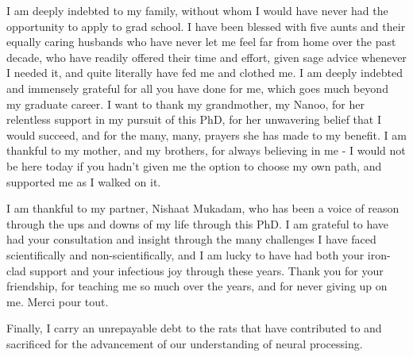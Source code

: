 \documentclass{brandeis-dissertation3.12}
\begin{document}
\begin{dissertation-acknowledgements}
I am deeply indebted to my family, without whom I would have never had the opportunity to apply to grad school. I have been blessed with five aunts and their equally caring husbands who have never let me feel far from home over the past decade, who have readily offered their time and effort, given sage advice whenever I needed it, and quite literally have fed me and clothed me. I am deeply indebted and immensely grateful for all you have done for me, which goes much beyond my graduate career. I want to thank my grandmother, my Nanoo, for her relentless support in my pursuit of this PhD, for her unwavering belief that I would succeed, and for the many, many, prayers she has made to my benefit. I am thankful to my mother, and my brothers, for always believing in me - I would not be here today if you hadn’t given me the option to choose my own path, and supported me as I walked on it.

I am thankful to my partner, Nishaat Mukadam, who has been a voice of reason through the ups and downs of my life through this PhD. I am grateful to have had your consultation and insight through the many challenges I have faced scientifically and non-scientifically, and I am lucky to have had both your iron-clad support and your infectious joy through these years. Thank you for your friendship, for teaching me so much over the years, and for never giving up on me. Merci pour tout.

Finally, I carry an unrepayable debt to the rats that have contributed to and sacrificed for the advancement of our understanding of neural processing.

\end{dissertation-acknowledgements}
\end{document}
